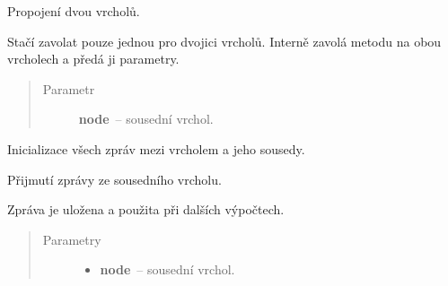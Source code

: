 \begin{fulllineitems}
\begin{fulllineitems}
\begin{quote}
\begin{description}
\end{description}\end{quote}

\end{fulllineitems}


\begin{fulllineitems}
\label{alex.infer:alex.infer.factor.alex.infer.node.DiscreteFactorNode.connect}
Propojení dvou vrcholů.

Stačí zavolat pouze jednou pro dvojici vrcholů.
Interně zavolá metodu {\hyperref[alex.infer:alex.infer.factor.alex.infer.node.DiscreteFactorNode.add_neighbor]{}} na obou vrcholech a předá ji parametry.
\begin{quote}\begin{description}
\item[{Parametr}] \leavevmode
\textbf{node}~-- sousední vrchol.

\end{description}\end{quote}

\end{fulllineitems}


\begin{fulllineitems}
\label{alex.infer:alex.infer.factor.alex.infer.node.DiscreteFactorNode.init_messages}
Inicializace všech zpráv mezi vrcholem a jeho sousedy.

\end{fulllineitems}


\begin{fulllineitems}
\label{alex.infer:alex.infer.factor.alex.infer.node.DiscreteFactorNode.message_from}
Přijmutí zprávy ze sousedního vrcholu.

Zpráva je uložena a použita při dalších výpočtech.
\begin{quote}\begin{description}
\item[{Parametry}] \leavevmode\begin{itemize}
\item {} 
\textbf{node}~-- sousední vrchol.


\end{itemize}
\end{description}
\end{quote}
\end{fulllineitems}
\end{fulllineitems}
